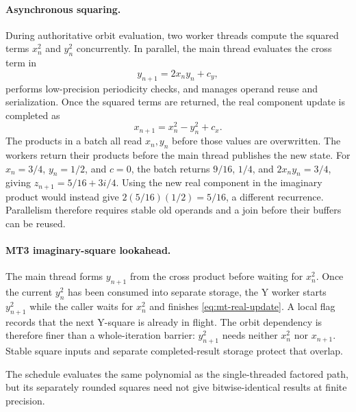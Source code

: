\paragraph{Asynchronous squaring.}
During authoritative orbit evaluation, two worker threads compute the squared
terms \(x_n^2\) and \(y_n^2\) concurrently.  In parallel, the main thread
evaluates the cross term in
\[
  y_{n+1} = 2 x_n y_n + c_y,
\]
performs low-precision periodicity checks, and manages operand reuse and
serialization.  Once the squared terms are returned, the real component update
is completed as
\begin{equation}
  x_{n+1} = x_n^2 - y_n^2 + c_x.
  \label{eq:mt-real-update}
\end{equation}
The products in a batch all read $x_n,y_n$ before those values are overwritten.
The workers return their products before the main thread publishes the new
state.  For $x_n=3/4$, $y_n=1/2$, and $c=0$, the batch returns $9/16$,
$1/4$, and $2x_ny_n=3/4$, giving $z_{n+1}=5/16+3i/4$.
Using the new real component in the imaginary product would instead give
$2(5/16)(1/2)=5/16$, a different recurrence.  Parallelism therefore requires
stable old operands and a join before their buffers can be reused.

\paragraph{MT3 imaginary-square lookahead.}
The main thread forms $y_{n+1}$ from the cross product before waiting for
$x_n^2$. Once the current $y_n^2$ has been consumed into separate storage,
the Y worker starts $y_{n+1}^2$ while the caller waits for $x_n^2$ and finishes
\eqref{eq:mt-real-update}. A local flag records that the next Y-square is
already in flight. The orbit dependency is therefore finer than a whole-iteration
barrier: $y_{n+1}^2$ needs neither $x_n^2$ nor $x_{n+1}$. Stable square inputs and
separate completed-result storage protect that overlap.

The schedule evaluates the same polynomial as the single-threaded factored
path, but its separately rounded squares need not give bitwise-identical
results at finite precision.

